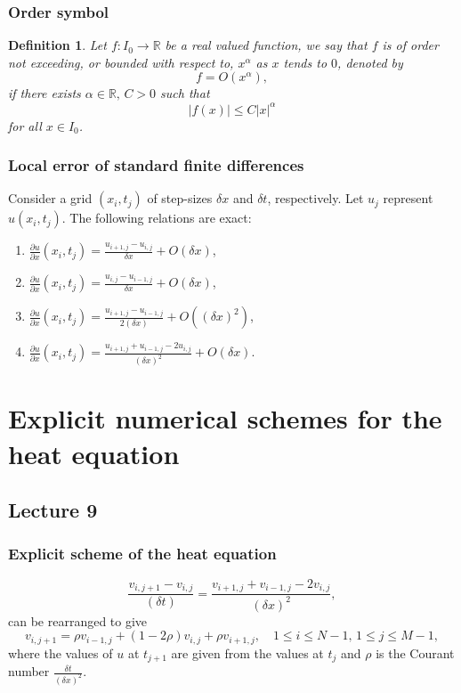 \documentclass{article}
\newtheorem{definition}{Definition}
\begin{document}
\subsubsection{Order symbol}
\begin{definition}
    Let $f:I_0\to\mathbb{R}$ be a real valued function, we say that $f$ is of order not exceeding, or bounded with respect to, $x^\alpha$ as $x$ tends to $0$, denoted by
    \begin{equation}
        f=O(x^\alpha), \nonumber
    \end{equation}
    if there exists $\alpha\in \mathbb{R},\,C>0$ such that 
    \begin{equation}
        \vert f(x) \vert \leq C\vert x \vert^\alpha
    \end{equation}
    for all $x\in I_0$.
\end{definition}
\subsubsection{Local error of standard finite differences}
Consider a grid $(x_i,t_j)$ of step-sizes $\delta x$ and $\delta t$, respectively. Let $u_j$ represent $u(x_i,t_j)$. The following relations are exact:
\begin{enumerate}
    \item $\frac{\partial u}{\partial x}(x_i,t_j) = \frac{u_{i+1,j}-u_{i,j}}{\delta x} + O(\delta x)$,
    \item $\frac{\partial u}{\partial x}(x_i,t_j) = \frac{u_{i,j}-u_{i-1,j}}{\delta x} + O(\delta x)$,
    \item $\frac{\partial u}{\partial x}(x_i,t_j) = \frac{u_{i+1,j}-u_{i-1,j}}{2(\delta x)} + O((\delta x)^2)$,
    \item $\frac{\partial u}{\partial x}(x_i,t_j) = \frac{u_{i+1,j}+u_{i-1,j}-2u_{i,j}}{(\delta x)^2} + O(\delta x)$.
\end{enumerate}

\section{Explicit numerical schemes for the heat equation}
\subsection{Lecture 9}
\subsubsection{Explicit scheme of the heat equation}
\begin{equation}
    \frac{v_{i,j+1}-v_{i,j}}{(\delta t)}=\frac{v_{i+1,j}+v_{i-1,j}-2v_{i,j}}{(\delta x)^2}\nonumber,
\end{equation}
can be rearranged to give
\begin{equation}
    v_{i,j+1} = \rho v_{i-1,j}+(1-2\rho)v_{i,j}+\rho v_{i+1,j},\quad 1\leq i\leq N-1,\, 1\leq j \leq M-1, \label{eq:1dheatexpl}
\end{equation}
where the values of $u$ at $t_{j+1}$ are given from the values at $t_j$ and $\rho$ is the Courant number $\frac{\delta t}{(\delta x)^2}$.
\end{document}
